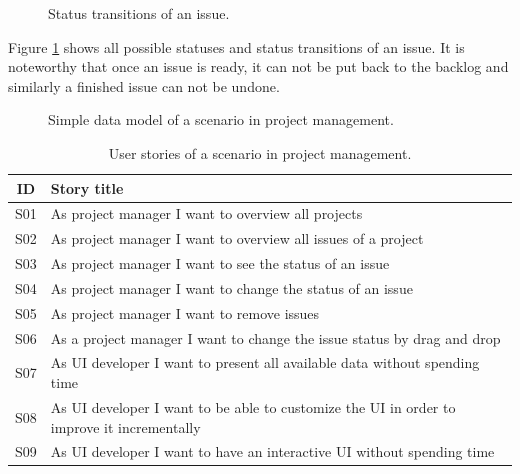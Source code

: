 \begin{figure}[!htb]
  \caption{Status transitions of an issue.}
  \label{fig:statetransition}
\end{figure}

Figure \ref{fig:statetransition} shows all possible statuses and status transitions of an issue. It is noteworthy that once an issue is ready, it can not be put back to the backlog and similarly a finished issue can not be undone.

\begin{figure}[!htb]
  \caption{Simple data model of a scenario in project management.}
\end{figure}

\begin{table}
  \begin{center}
    \begin{tabular}{ |c|l| }
      \hline
      ID & Story title \\
      \hline
      S01 & As project manager I want to overview all projects \\
      S02 & As project manager I want to overview all issues of a project \\
      S03 & As project manager I want to see the status of an issue \\
      S04 & As project manager I want to change the status of an issue \\
      S05 & As project manager I want to remove issues \\
      S06 & As a project manager I want to change the issue status by drag and drop \\
      S07 & As UI developer I want to present all available data without spending time \\
      S08 & As UI developer I want to be able to customize the UI in order to improve it incrementally \\
      S09 & As UI developer I want to have an interactive UI without spending time \\
      \hline
    \end{tabular}
    \caption{User stories of a scenario in project management.}
    \label{tab:usecase2}
  \end{center}
\end{table}

